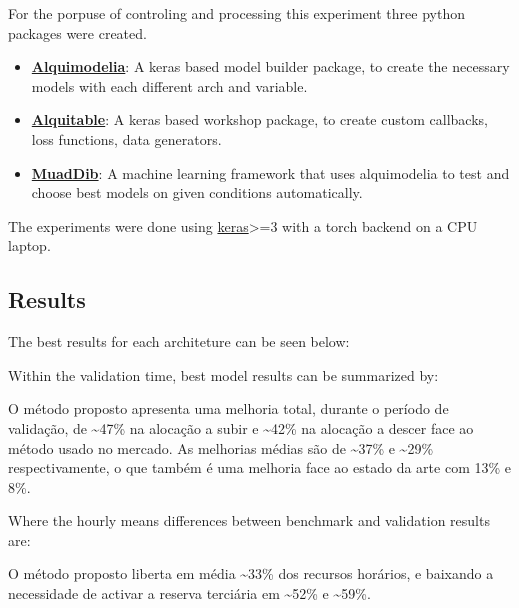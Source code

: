 For the porpuse of controling and processing this experiment three python packages were created.

\begin{itemize}
    \item \textbf{\href{https://github.com/alquimodelia/alquimodelia}{Alquimodelia}}: A keras based model builder package, to create the necessary models with each different arch and variable.
    \item \textbf{\href{https://github.com/alquimodelia/alquitable}{Alquitable}}: A keras based workshop package, to create custom callbacks, loss functions, data generators.
    \item \textbf{\href{https://github.com/alquimodelia/MuadDib}{MuadDib}}: A machine learning framework that uses alquimodelia to test and choose best models on given conditions automatically.
\end{itemize}

The experiments were done using \href{https://keras.io/}{keras}>=3 with a torch backend on a CPU laptop.

\subsection{Results}

The best results for each architeture can be seen below:



Within the validation time, best model results can be summarized by:

% 


O método proposto apresenta uma melhoria total, durante o período de validação, de \textasciitilde47\% na alocação a subir e \textasciitilde42\% na alocação a descer face ao método usado no mercado. As melhorias médias são de \textasciitilde37\% e \textasciitilde29\% respectivamente, o que também é uma melhoria face ao estado da arte \cite{Algarvio2024} com 13\% e 8\%.\par


Where the hourly means differences between benchmark and validation results are:

% 

O método proposto liberta em média \textasciitilde33\% dos recursos horários, e baixando a necessidade de activar a reserva terciária em \textasciitilde52\% e \textasciitilde59\%.\par


